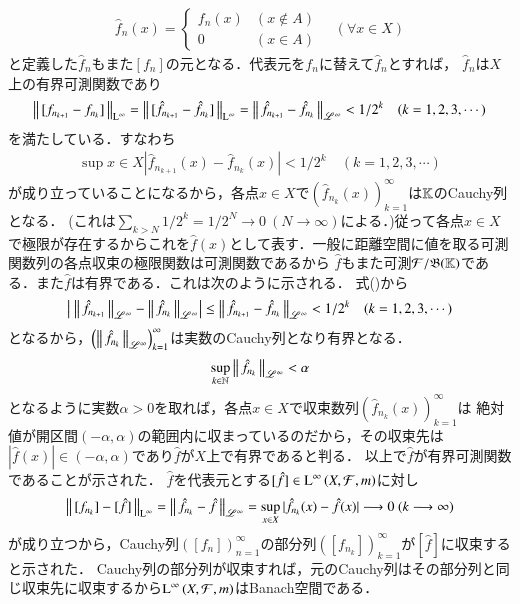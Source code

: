 \begin{qst}
\begin{prf}
\begin{description}
\begin{align}
				\hat{f}_n(x) =
				\begin{cases}
					f_n(x) & (x \notin A) \\
					0 & (x \in A)
				\end{cases}
				\quad (\forall x \in X)
			\end{align}
			と定義した$\hat{f}_n$もまた$[f_n]$の元となる．代表元を$f_n$に替えて$\hat{f}_n$とすれば，
			$\hat{f}_n$は$X$上の有界可測関数であり
			\begin{align}
				\left\|\, [f_{n_{k+1}} - f_{n_k}]\, \right\|_{\mathrm{L}^\infty} = \left\|\, [\hat{f}_{n_{k+1}} - \hat{f}_{n_k}]\, \right\|_{\mathrm{L}^\infty}
				= \left\|\, \hat{f}_{n_{k+1}} - \hat{f}_{n_k}\, \right\|_{\mathscr{L}^\infty} < 1/2^k \quad (k=1,2,3,\cdots) \label{ineq:Lp_banach_1}
			\end{align}
			を満たしている．すなわち
			\begin{align}
				\sup{x \in X}{|\hat{f}_{n_{k+1}}(x) - \hat{f}_{n_k}(x)|} < 1/2^k \quad (k=1,2,3,\cdots) 
			\end{align}
			が成り立っていることになるから，各点$x \in X$で$\left( \hat{f}_{n_k}(x) \right)_{k=1}^{\infty}$は$\mathbb{K}$のCauchy列となる．
			(これは$\sum_{k > N} 1/2^k = 1/2^N \longrightarrow 0\ (N \longrightarrow \infty)$による．)従って各点$x \in X$
			で極限が存在するからこれを$\hat{f}(x)$として表す．一般に距離空間に値を取る可測関数列の各点収束の極限関数は可測関数であるから
			$\hat{f}$もまた可測$\mathcal{F}/\mathfrak{B}(\mathbb{K})$である．また$\hat{f}$は有界である．これは次のように示される．
			式()から
			\begin{align}
				\left|\ \left\|\, \hat{f}_{n_{k+1}}\, \right\|_{\mathscr{L}^\infty} - \left\|\, \hat{f}_{n_k}\, \right\|_{\mathscr{L}^\infty} \right| 
				\leq \left\|\, \hat{f}_{n_{k+1}} - \hat{f}_{n_k}\, \right\|_{\mathscr{L}^\infty} < 1/2^k \quad (k=1,2,3,\cdots)
			\end{align}
			となるから，$\left( \left\|\, \hat{f}_{n_k}\, \right\|_{\mathscr{L}^\infty} \right)_{k=1}^{\infty}$は実数のCauchy列となり有界となる．
			\begin{align}
				\operatorname*{sup}_{k \in \mathbb{N}} \left\|\, \hat{f}_{n_k}\, \right\|_{\mathscr{L}^\infty} < \alpha
			\end{align}
			となるように実数$\alpha > 0$を取れば，各点$x \in X$で収束数列$\left( \hat{f}_{n_k}(x) \right)_{k=1}^{\infty}$は
			絶対値が開区間$(-\alpha,\alpha)$の範囲内に収まっているのだから，その収束先は$|\hat{f}(x)| \in (-\alpha,\alpha)$であり$\hat{f}$が$X$上で有界であると判る．
			以上で$\hat{f}$が有界可測関数であることが示された．
			$\hat{f}$を代表元とする$[\hat{f}] \in \operatorname{L}^{\infty} \left(X,\mathcal{F},m\right)$に対し
			\begin{align}
				\left\|\, [f_{n_k}] - [\hat{f}]\, \right\|_{\mathrm{L}^\infty} = \left\|\, \hat{f}_{n_k} - \hat{f}\, \right\|_{\mathscr{L}^\infty} 
				= \operatorname*{sup}_{x \in X} |\hat{f}_{n_k}(x) - \hat{f}(x)|
				\longrightarrow 0 \ (k \longrightarrow \infty)
			\end{align}
			が成り立つから，Cauchy列$\left( [f_{n}] \right)_{n=1}^{\infty}$の部分列$\left( [f_{n_k}] \right)_{k=1}^{\infty}$が$[\hat{f}]$に収束すると示された．
			Cauchy列の部分列が収束すれば，元のCauchy列はその部分列と同じ収束先に収束するから$\operatorname{L}^{\infty} \left(X,\mathcal{F},m\right)$はBanach空間である．
			

\end{description}
\end{prf}
\end{qst}
